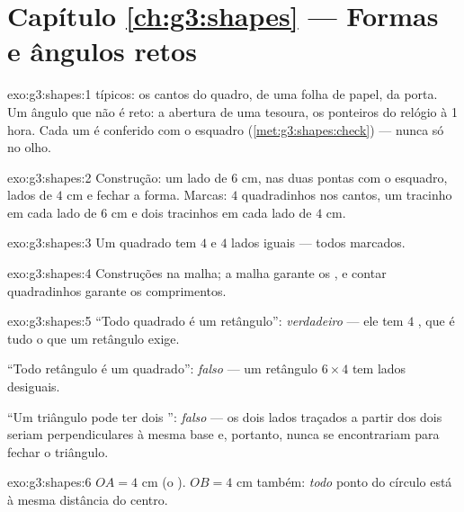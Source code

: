 \section*{Capítulo \ref{ch:g3:shapes} --- Formas e ângulos retos}

\begin{solution}{exo:g3:shapes:1}
 típicos: os cantos do quadro, de uma folha de papel,
da porta. Um ângulo que não é reto: a abertura de uma tesoura, os
ponteiros do relógio à 1 hora. Cada um é conferido com o esquadro
(\cref{met:g3:shapes:check}) --- nunca só no olho.
\end{solution}

\begin{solution}{exo:g3:shapes:2}
Construção: um lado de $6$ cm,  nas duas pontas com o
esquadro, lados de $4$ cm e fechar a forma. Marcas: $4$ quadradinhos
nos cantos, um tracinho em cada lado de $6$ cm e dois tracinhos em
cada lado de $4$ cm.
\end{solution}

\begin{solution}{exo:g3:shapes:3}
Um quadrado tem $4$  e $4$ lados iguais --- todos
marcados.
\end{solution}

\begin{solution}{exo:g3:shapes:4}
Construções na malha; a malha garante os , e contar
quadradinhos garante os comprimentos.
\end{solution}

\begin{solution}{exo:g3:shapes:5}
``Todo quadrado é um retângulo'': \emph{verdadeiro} --- ele tem $4$
, que é tudo o que um retângulo exige.

``Todo retângulo é um quadrado'': \emph{falso} --- um retângulo
$6 \times 4$ tem lados desiguais.

``Um triângulo pode ter dois '': \emph{falso} --- os
dois lados traçados a partir dos dois  seriam
perpendiculares à mesma base e, portanto, nunca se encontrariam para
fechar o triângulo.
\end{solution}

\begin{solution}{exo:g3:shapes:6}
$OA = 4$ cm (o ). $OB = 4$ cm também: \emph{todo} ponto do
círculo está à mesma distância do centro.
\end{solution}


